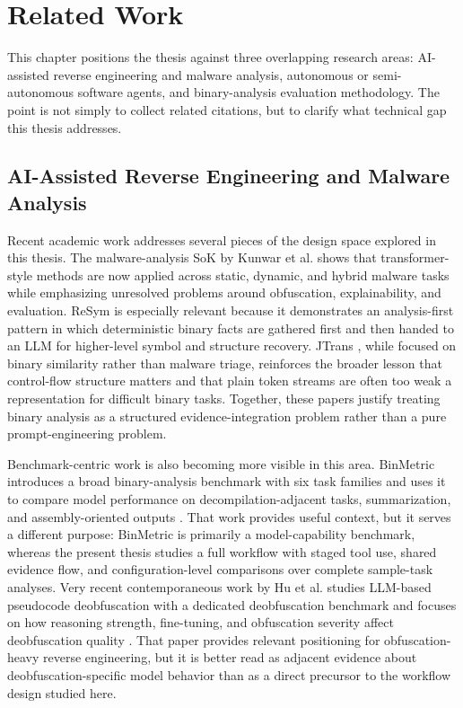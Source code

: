 \chapter{Related Work}
\label{sec:related}

This chapter positions the thesis against three overlapping research areas: AI-assisted reverse engineering and malware analysis, autonomous or semi-autonomous software agents, and binary-analysis evaluation methodology. The point is not simply to collect related citations, but to clarify what technical gap this thesis addresses.

\section{AI-Assisted Reverse Engineering and Malware Analysis}

Recent academic work addresses several pieces of the design space explored in this thesis. The malware-analysis SoK by Kunwar et al. \cite{kunwar2024sok} shows that transformer-style methods are now applied across static, dynamic, and hybrid malware tasks while emphasizing unresolved problems around obfuscation, explainability, and evaluation. ReSym \cite{xie2024resym} is especially relevant because it demonstrates an analysis-first pattern in which deterministic binary facts are gathered first and then handed to an LLM for higher-level symbol and structure recovery. JTrans \cite{wang2022jtrans}, while focused on binary similarity rather than malware triage, reinforces the broader lesson that control-flow structure matters and that plain token streams are often too weak a representation for difficult binary tasks. Together, these papers justify treating binary analysis as a structured evidence-integration problem rather than a pure prompt-engineering problem.

Benchmark-centric work is also becoming more visible in this area. BinMetric introduces a broad binary-analysis benchmark with six task families and uses it to compare model performance on decompilation-adjacent tasks, summarization, and assembly-oriented outputs \cite{shang2025binmetriccomprehensivebinaryanalysis}. That work provides useful context, but it serves a different purpose: BinMetric is primarily a model-capability benchmark, whereas the present thesis studies a full workflow with staged tool use, shared evidence flow, and configuration-level comparisons over complete sample-task analyses. Very recent contemporaneous work by Hu et al. studies LLM-based pseudocode deobfuscation with a dedicated deobfuscation benchmark and focuses on how reasoning strength, fine-tuning, and obfuscation severity affect deobfuscation quality \cite{hu2026llmsdeobfuscatebinarycode}. That paper provides relevant positioning for obfuscation-heavy reverse engineering, but it is better read as adjacent evidence about deobfuscation-specific model behavior than as a direct precursor to the workflow design studied here.

